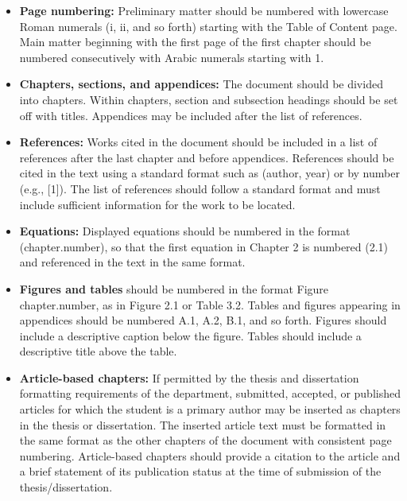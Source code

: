 \begin{itemize}
\item {\bfseries Page numbering:} Preliminary matter should be numbered with lowercase Roman numerals (i, ii, and so forth) starting with the Table of Content page. Main matter beginning with the first page of the first chapter should be numbered consecutively with Arabic numerals starting with 1. 

\item {\bfseries Chapters, sections, and appendices:} The document should be divided into chapters. Within chapters, section and subsection headings should be set off with titles. Appendices may be included after the list of references.

\item {\bfseries References:} Works cited in the document should be included in a list of references after the last chapter and before appendices. References should be cited in the text using a standard format such as (author, year) or by number (e.g., [1]). The list of references should follow a standard format and must include sufficient information for the work to be located. 

\item {\bfseries Equations:} Displayed equations should be numbered in the format (chapter.number), so that the first equation in Chapter 2 is numbered (2.1) and referenced in the text in the same format. 

\item {\bfseries Figures and tables} should be numbered in the format Figure chapter.number, as in Figure 2.1 or Table 3.2. Tables and figures appearing in appendices should be numbered A.1, A.2, B.1, and so forth. Figures should include a descriptive caption below the figure. Tables should include a descriptive title above the table. 

\item {\bfseries Article-based chapters:} If permitted by the thesis and dissertation formatting requirements of the department, submitted, accepted, or published articles for which the student is a primary author may be inserted as chapters in the thesis or dissertation. The inserted article text must be formatted in the same format as the other chapters of the document with consistent page numbering. Article-based chapters should provide a citation to the article and a brief statement of its publication status at the time of submission of the thesis/dissertation.
\end{itemize}
